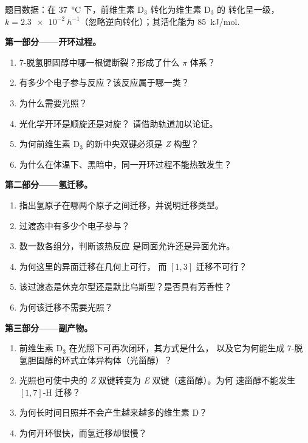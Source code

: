 \begin{problem}
\label{pb:b3:pericyclic:1}
题目数据：在 \qty{37}{\celsius} 下，前维生素 D$_3$ 转化为维生素 D$_3$ 的
转化呈一级，$k = \qty{2.3e-2}{h^{-1}}$（忽略逆向转化）；其活化能为
\qty{85}{kJ/mol}.

\medskip\noindent\textbf{第一部分——开环过程。}
\begin{enumerate}
  \item 7-脱氢胆固醇中哪一根键断裂？形成了什么 $\pi$ 体系？
  \item 有多少个电子参与反应？该反应属于哪一类？
  \item 为什么需要光照？
  \item 光化学开环是顺旋还是对旋？
        请借助轨道加以论证。
  \item 为何前维生素 D$_3$ 的新中央双键必须是 \textit{Z} 构型？
  \item 为什么在体温下、黑暗中，同一开环过程不能热致发生？
\end{enumerate}

\medskip\noindent\textbf{第二部分——氢迁移。}
\begin{enumerate}[resume]
  \item 指出氢原子在哪两个原子之间迁移，并说明迁移类型。
  \item 过渡态中有多少个电子参与？
  \item 数一数各组分，判断该热反应
        是同面允许还是异面允许。
  \item 为何这里的异面迁移在几何上可行，
        而 $[1,3]$ 迁移不可行？
  \item 该过渡态是休克尔型还是默比乌斯型？是否具有芳香性？
  \item 为何该迁移不需要光照？
\end{enumerate}

\medskip\noindent\textbf{第三部分——副产物。}
\begin{enumerate}[resume]
  \item 前维生素 D$_3$ 在光照下可再次闭环，其方式是什么，
        以及它为何能生成 7-脱氢胆固醇的环式立体异构体（光甾醇）？
  \item 光照也可使中央的 \textit{Z} 双键转变为 \textit{E} 双键（速甾醇）。为何
        速甾醇不能发生 $[1,7]$-H 迁移？
  \item 为何长时间日照并不会产生越来越多的维生素 D？
  \item 为何开环很快，而氢迁移却很慢？
\end{enumerate}


\end{problem}
